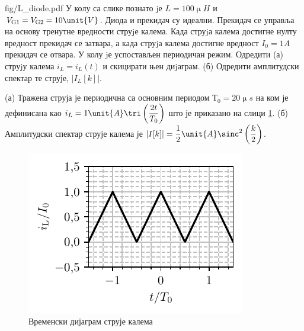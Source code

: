 \begin{slikaDesno}{fig/L_diode.pdf}
    \PID 
    У колу са слике познато jе $L = 100\unit{\upmu H}$ и 
    $V_{\rm G1} = V_{\rm G2} = 10\unit{V}$. Диода и
    прекидач су идеални. Прекидач се управља на основу тренутне вредности
    струjе калема. Када струjа калема достигне нулту вредност прекидач се
    затвара, а када струjа калема достигне вредност $I_0 = 1\unit{A}$ прекидач се
    отвара. У колу jе успостављен периодичан режим. 
    Одредити (а) струjу
    калема $i_L = i_L (t)$ и скицирати њен диjаграм. 
    (б) Одредити амплитудски спектар те струје, $|I_L [k]|$.    
\end{slikaDesno}

\REZULTAT 
(а) Тражена струја је периодична са основним периодом $Т_0 = 20\unit{\upmu s}$ на ком је дефинисана као 
$i_L = 1\unit{A} \tri\left(\dfrac{2t}{T_0}\right)$ што је приказано на слици \ref{fig:\ID.iL}. 
(б) Амплитудски спектар струје калема је 
$|I[k]| = \dfrac{1}{2}\unit{A} \sinc^2\left( \dfrac{k}{2} \right)$.

\begin{figure}
    \centering
    \includegraphics{fig/L_diode_iLL}
    \caption{Временски дијаграм струје калема}
    \label{fig:\ID.iL}
\end{figure}